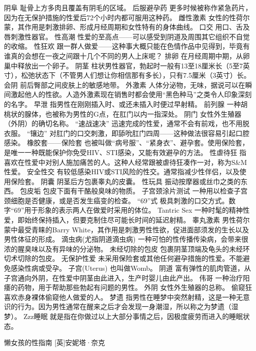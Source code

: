 \documentclass[12pt,UTF8]{ctexbook}
\begin{document}
阴阜
耻骨上方多肉且覆盖有阴毛的区域。
后服避孕药
更多时候被称作紧急药片，因为在无保护措施的性爱后72个小时内都可服用这种药。
雌性激素
女性的性荷尔蒙，其作用是刺激排卵、形成月经周期和女性特有的身体曲线。
口交
用口、舌及唇刺激性器官。
性高潮
性爱的至高点——可以感受到阴道及周围其它组织不自觉的收缩。
性狂欢
跟一群人做爱——这种事大概只能在色情作品中见得到，毕竟有谁真的会想在一夜之间跟十几个不同的男人上床呢？
排卵
在月经周期中期，从卵巢中释放出一个卵子。
阴茎
柱状男性器官，勃起时一般有13至18厘米长（5至7英寸），松弛状态下（不管男人们想让你相信那有多长），只有7.5厘米（3英寸）长。
会阴
前后臀部之间皮肤上的敏感地带。
外激素
人体分泌物，无味，据说可以在瞬间激起他人的性欲。人造外激素现在销售时都会使用“黑色种马”之类令人印象深刻的名字。
早泄
指男性在刚刚插入时、或还未插入时便过早射精。
前列腺
一种胡桃状的腺体，也被称为男性的G点，在肛门以内一指深处。
阴门
女性外生殖器（外阴）的确切名称。
“速战速决”
迅速完成的性爱，通常不会有前戏，也不用脱衣服。
“镶边”
对肛门的口交刺激，即舔吮肛门四周——这种做法很容易引起口腔感染。
橡胶套——保险套
也被叫做“病号服”、“紧身衣”、避孕套。使用保险套，是唯一一种既能保护你免受HIV、STI感染，又能有效避孕的方法。
性虐待狂
指喜欢在性爱中对别人施加痛苦的人。这种人经常跟被虐待狂凑作一对，称为S\&M性爱。
安全性交
有较低感染HIV或STI风险的性交。通常指减少性伴侣，以及使用保险套。
阴囊
阴茎后方包裹睾丸的皮囊。
性玩具
振动按摩器或丝巾之类的东西。
包皮垢
包皮下面有干酪般臭味的物质。
子宫颈涂片测试
一种用以检查子宫颈细胞是否健康，或是否发生癌变的检查。
“69”式
极具刺激的口交方式。数字“69”用于形象的表示两人在做爱时采用的体位。
Tantric Sex
一种时髦的精神性爱，即始终保持插入，但要克制住尽可能长时间的延迟射精。
睾丸激素
男性荷尔蒙中最受青睐的Barry White，其作用是刺激男性性欲，促进面部须发的生长以及男性体征的形成。
滴虫病(尤指阴道滴虫病)
一种可怕的性传播传染病，会带来很浓的腥臭味以及有异味的分泌物。
未经切除的包皮
包裹阴茎顶端及龟头的未经环切术切除的包皮。
无保护性爱
未采用保险套或其他任何避孕措施的性爱。不能避免感染性病或受孕。
子宫(Uterus)
也叫做Womb。
阴道
富有弹性的肌肉管道，从子宫通向外阴，在性爱中阴茎由此进入，生产时婴儿由此产出。
伟哥
一种治疗阳痿的药物，用于帮助那些勃起有问题的男性。
外阴
女性外生殖器的总称。
偷窥狂
喜欢赤身裸体偷窥他人做爱的人。
梦遗
指男性在睡梦中突然射精，这是一种无意识的行为。因为男性通常在醒来之后才会发现一身潮湿，所以称之为梦遗（湿梦）。
Zzz睡眠
就是指在你做过以上大部分事情之后，因极度疲劳而进入的睡眠状态。

\backmatter
懒女孩的性指南  [英]安妮塔·奈克
\end{document}
